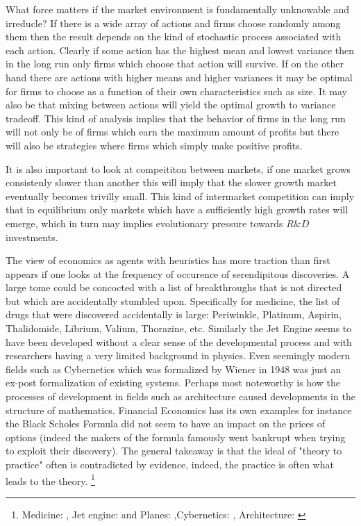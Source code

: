 \documentclass[12pt]{article}
\numberwithin{equation}{section}
\begin{document}
What force matters if the market environment is fundamentally unknowable and irreducle? If there is a wide array of actions and firms choose randomly among them then the result depends on the kind of stochastic process associated with each action. Clearly if some action has the highest mean and lowest variance then in the long run only firms which choose that action will survive\cite{alchian1950uncertainty}. If on the other hand there are actions with higher means and higher variances it may be optimal for firms to choose as a function of their own characteristics such as size. It may also be that mixing between actions will yield the optimal growth to variance tradeoff. This kind of analysis implies that the behavior of firms in the long run will not only be of firms which earn the maximum amount of profits but there will also be strategies where firms which simply make positive profits. 

It is also important to look at compeititon between markets, if one market grows consistenly slower than another this will imply that the slower growth market eventually becomes trivilly small. This kind of intermarket competition can imply that in equilibrium only markets which have a sufficiently high growth rates will emerge, which in turn may implies evolutionary pressure towards $R\&D$ investments. 

The view of economics as agents with heuristics has more traction than first appears if one looks at the frequency of occurence of serendipitous discoveries. A large tome could be concocted with a list of breakthroughs that is not directed but which are accidentally stumbled upon. Specifically for medicine, the list of drugs that were discovered accidentally is large: Periwinkle, Platinum, Aspirin, Thalidomide, Librium, Valium, Thorazine, etc. Similarly the Jet Engine seems to have been developed without a clear sense of the developmental process and with researchers having a very limited background in physics. Even seemingly modern fields such as Cybernetics which was formalized by Wiener in 1948 was just an ex-post formalization of existing systems. Perhaps most noteworthy is how the processes of development in fields such as architecture caused developments in the structure of mathematics. Financial Economics has its own examples for instance the Black Scholes Formula did not seem to have an impact on the prices of options (indeed the makers of the formula famously went bankrupt when trying to exploit their discovery). The general takeaway is that the ideal of "theory to practice" often is contradicted by evidence, indeed, the practice is often what leads to the theory. \footnote{ Medicine: \cite{meyers2007happy}, Jet engine: \cite{scranton2006urgency} and Planes: \cite{meyer2013airplane},Cybernetics: \cite{mindell2002between}, Architecture: \cite{unguru1992guy}}
\end{document}
